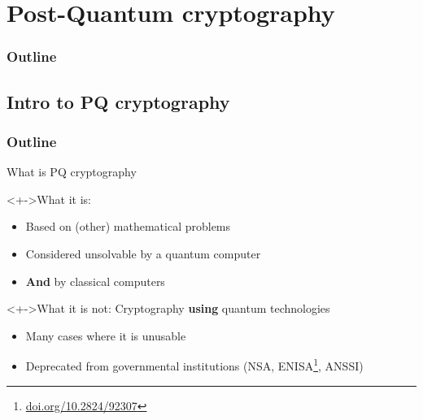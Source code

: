 \documentclass{beamer}
\begin{document}
\section{Post-Quantum cryptography}
\begin{frame}
  \frametitle{Outline}
  \tableofcontents[currentsection]
\end{frame}

\subsection{Intro to PQ cryptography}
\begin{frame}
  \frametitle{Outline}
\end{frame}

\begin{frame}{What is PQ cryptography}
	\begin{block}<+->{What it is:}
		\begin{itemize}
			\item Based on (other) mathematical problems
			\item Considered unsolvable by a quantum computer
			\item<+-> \textbf{And} by classical computers
		\end{itemize}
	\end{block}

	\begin{block}<+->{What it is not:}
		Cryptography \textbf{using} quantum technologies
		\begin{itemize}
			\item Many cases where it is unusable
			\item Deprecated from governmental institutions (NSA, ENISA\footnote{\url{doi.org/10.2824/92307}}, ANSSI)
		\end{itemize}
	\end{block}
\end{frame}
\end{document}
